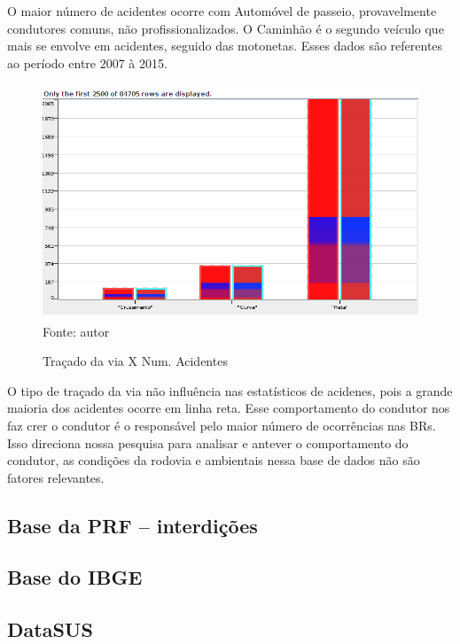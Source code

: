O maior número de acidentes ocorre com Automóvel de passeio, provavelmente condutores comuns, não profissionalizados.
O Caminhão é o segundo veículo que mais se envolve em acidentes, seguido das motonetas. 
Esses dados são referentes ao período entre 2007 à 2015.

\begin{figure}[ht]
\begin{center}
\caption{Traçado da via X Num. Acidentes}
\includegraphics[width=120mm, height=70mm]{Figuras/Preprocess/TracadoViaNumAcident.png}\\
\tiny Fonte: autor
\end{center}
\end{figure}

O tipo de traçado da via não influência nas estatísticos de acidenes, pois a grande maioria dos acidentes ocorre em linha reta.
Esse comportamento do condutor nos faz crer o condutor é o responsável pelo maior número de ocorrências nas BRs.
Isso direciona nossa pesquisa para analisar e antever o comportamento do condutor, as condições da rodovia e ambientais nessa base
de dados não são fatores relevantes.

\pagebreak

\subsection{Base da PRF -- interdições}

\subsection{Base do IBGE}

\subsection{DataSUS}


